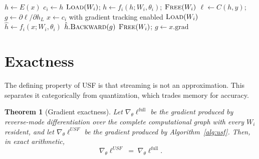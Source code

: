 \documentclass[preprint,12pt]{elsarticle}
\newtheorem{theorem}{Theorem}
\newcommand{\usf}{USF}
\begin{document}
\begin{algorithm}[t]
\caption{\usf{} (batch-major, layer granularity)}
\label{alg:usf}
\begin{algorithmic}[1]
\State $h \gets E(x)$
 
    \State $c_i \gets h$ 
    \State $\textsc{Load}(W_i)$; \; $h \gets f_i(h; W_i, \theta_i)$; \; $\textsc{Free}(W_i)$
\EndFor
\State $\ell \gets C(h,y)$; \; $g \gets \partial\ell/\partial h_L$
 
    \State $x \gets c_i$ with gradient tracking enabled
    \State $\textsc{Load}(W_i)$
    \State $\hat h \gets f_i(x; W_i, \theta_i)$ 
    \State $\hat h.\textsc{Backward}(g)$ 
    \State $\textsc{Free}(W_i)$; \; $g \gets x.\mathrm{grad}$
\EndFor
\end{algorithmic}
\end{algorithm}

\section{Exactness}
\label{sec:exact}

The defining property of \usf{} is that streaming is not an approximation. This separates it
categorically from quantization, which trades memory for accuracy.

\begin{theorem}[Gradient exactness]
\label{thm:exact}
Let $\nabla_\theta \ell^{\mathrm{full}}$ be the gradient produced by reverse-mode differentiation
over the complete computational graph with every $W_i$ resident, and let
$\nabla_\theta \ell^{\usf}$ be the gradient produced by Algorithm~\ref{alg:usf}. Then, in exact arithmetic,
\begin{equation}
\nabla_\theta \ell^{\usf} \;=\; \nabla_\theta \ell^{\mathrm{full}} .
\end{equation}
\end{theorem}
\end{document}
